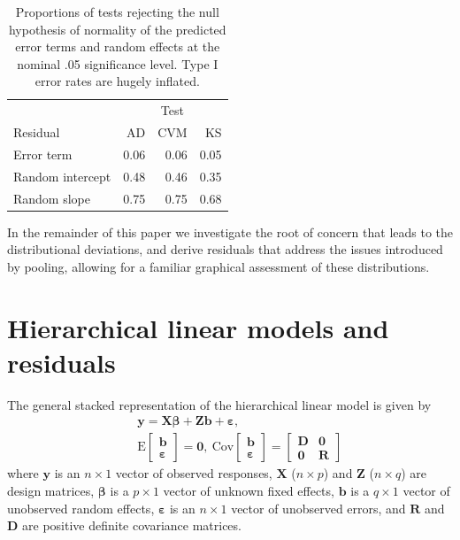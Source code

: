\documentclass{article} %
\newcommand{\E}{\ensuremath{\mathrm{E}}}
\newcommand{\cov}{\ensuremath{\mathrm{Cov}}}
\begin{document}
\begin{table}[!h]
\caption{\label{tab:edf} Proportions of tests rejecting the null hypothesis of normality of the predicted error terms and random effects at the nominal .05 significance level. Type I error rates are hugely inflated. \vspace{.5em}
}
\begin{center}
\begin{tabular}{l rrr} \hline
& \multicolumn{3}{c}{Test} \\ \cline{2-4}
 Residual &  AD & CVM & KS \\ \hline
Error term			 & 0.06 & 0.06 & 0.05\\
\rowcolor{gray!20} Random intercept 	& 0.48 & 0.46 & 0.35\\
\rowcolor{gray!20} Random slope 		& 0.75 & 0.75 & 0.68\\
   \hline
\end{tabular}
\end{center}
\end{table}

In the remainder of this paper we investigate the root of concern that leads to the distributional deviations, and derive residuals that address the issues introduced by pooling, allowing for a familiar graphical assessment of these distributions.


\section{Hierarchical linear models and residuals}\label{sec:resid}
The general stacked representation of the hierarchical linear model is given by
%
\begin{eqnarray}\label{eq:hlm}
 && \bm{y} = \bm{X \beta} + \bm{Z b} + \bm{\varepsilon}, \\ \nonumber
 && \E \begin{bmatrix} \bm{b} \\ \bm{\varepsilon} \end{bmatrix} = \bm{0}, 
 \ \cov \begin{bmatrix} \bm{b} \\ \bm{\varepsilon} \end{bmatrix} = 
  	\begin{bmatrix} \bm{D} & \bm{0}\\ \bm{0} & \bm{R} \end{bmatrix}
\end{eqnarray}
%
where $\bm{y}$ is an $n \times 1$ vector of observed responses, $\bm{X}$ ($n \times p$) and $\bm{Z}$ ($n \times q$) are design matrices, $\bm{\beta}$ is a $p \times 1$ vector of unknown fixed effects, $\bm{b}$ is a $q \times 1$ vector of unobserved random effects, $\bm{\varepsilon}$ is an $n \times 1$ vector of unobserved errors, and $\bm{R}$ and $\bm{D}$ are positive definite covariance matrices.
\end{document}
